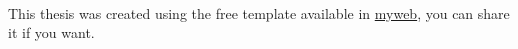 \texttt{   }  
  
  \vfill

\begin{center}
\footnotesize{
This thesis was created using the free template available in \url{myweb}, you can share it if you want. 
}
\end{center}
